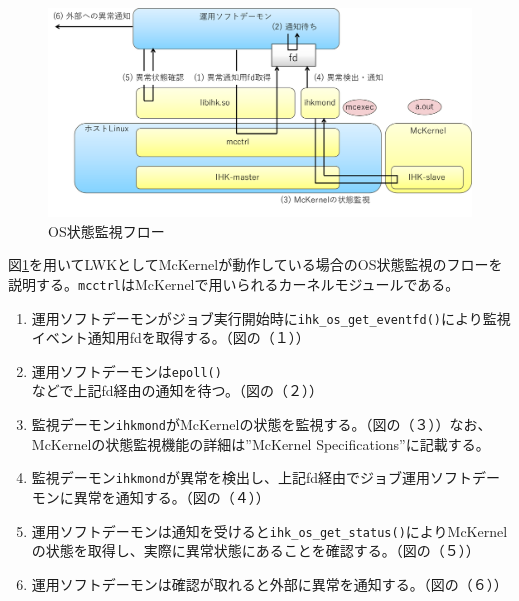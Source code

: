 \documentclass[twoside,11pt,fleqn]{book}
\begin{document}
\begin{figure}[!htb]
\centering
\includegraphics[width=14cm]{figs/monitor.pdf}
\vspace{-0em}\caption{OS状態監視フロー}
\label{fig:monitor}
\vspace{-0em}
\end{figure}
%
\FloatBarrier
%
図\ref{fig:monitor}を用いてLWKとしてMcKernelが動作している場合のOS状態監視のフローを説明する。\texttt{mcctrl}はMcKernelで用いられるカーネルモジュールである。
\begin{enumerate}
\item 運用ソフトデーモンがジョブ実行開始時に\texttt{ihk\_os\_get\_eventfd()}により監視イベント通知用fdを取得する。（図の（１））
\item 運用ソフトデーモンは\texttt{epoll()}などで上記fd経由の通知を待つ。（図の（２））
\item 監視デーモン\texttt{ihkmond}がMcKernelの状態を監視する。（図の（３））なお、McKernelの状態監視機能の詳細は''McKernel Specifications''に記載する。
\item 監視デーモン\texttt{ihkmond}が異常を検出し、上記fd経由でジョブ運用ソフトデーモンに異常を通知する。（図の（４））
\item 運用ソフトデーモンは通知を受けると\texttt{ihk\_os\_get\_status()}によりMcKernelの状態を取得し、実際に異常状態にあることを確認する。（図の（５））
\item 運用ソフトデーモンは確認が取れると外部に異常を通知する。（図の（６））
\end{enumerate}
\FloatBarrier
\end{document}
